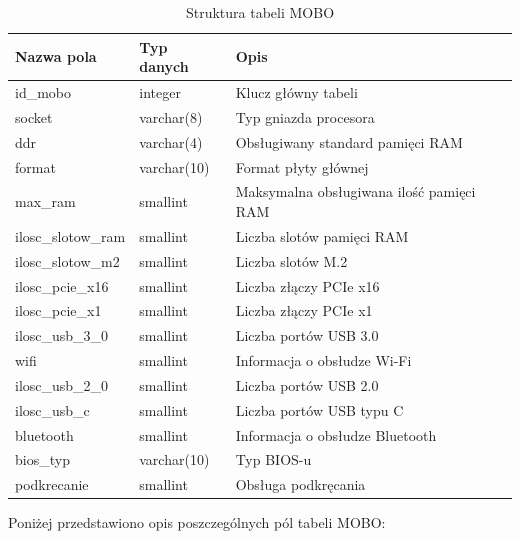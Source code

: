 \documentclass[a4paper,twoside,12pt]{book}
\begin{document}
\begin{table}[H]
\centering
\caption{Struktura tabeli MOBO}
\label{tab:mobo}
\begin{tabular}{lll}
\hline
Nazwa pola & Typ danych & Opis \\ \hline
id\_mobo & integer & Klucz główny tabeli \\
socket & varchar(8) & Typ gniazda procesora \\
ddr & varchar(4) & Obsługiwany standard pamięci RAM \\
format & varchar(10) & Format płyty głównej \\
max\_ram & smallint & Maksymalna obsługiwana ilość pamięci RAM \\
ilosc\_slotow\_ram & smallint & Liczba slotów pamięci RAM \\
ilosc\_slotow\_m2 & smallint & Liczba slotów M.2 \\
ilosc\_pcie\_x16 & smallint & Liczba złączy PCIe x16 \\
ilosc\_pcie\_x1 & smallint & Liczba złączy PCIe x1 \\
ilosc\_usb\_3\_0 & smallint & Liczba portów USB 3.0 \\
wifi & smallint & Informacja o obsłudze Wi-Fi \\
ilosc\_usb\_2\_0 & smallint & Liczba portów USB 2.0 \\
ilosc\_usb\_c & smallint & Liczba portów USB typu C \\
bluetooth & smallint & Informacja o obsłudze Bluetooth \\
bios\_typ & varchar(10) & Typ BIOS-u \\
podkrecanie & smallint & Obsługa podkręcania \\ \hline
\end{tabular}
\end{table}

Poniżej przedstawiono opis poszczególnych pól tabeli MOBO:
\end{document}
